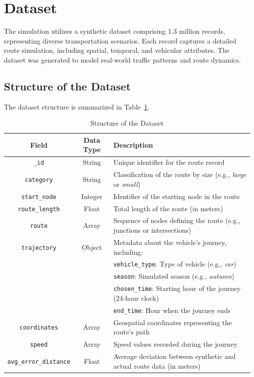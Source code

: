 \documentclass[sigplan,screen]{acmart}
\begin{document}
\section{Dataset}

The simulation utilizes a synthetic dataset comprising 1.3 million records, representing diverse transportation scenarios. Each record captures a detailed route simulation, including spatial, temporal, and vehicular attributes. The dataset was generated to model real-world traffic patterns and route dynamics.

\subsection{Structure of the Dataset}

The dataset structure is summarized in Table~\ref{tab:dataset-structure}.

\begin{table}[h!]
\centering
\caption{Structure of the Dataset}
\label{tab:dataset-structure}
\begin{tabular}{|c|c|l|}
\hline
\textbf{Field} & \textbf{Data Type} & \textbf{Description} \\ \hline
\texttt{\_id} & String & Unique identifier for the route record \\ \hline
\texttt{category} & String & Classification of the route by size (e.g., \textit{large} or \textit{small}) \\ \hline
\texttt{start\_node} & Integer & Identifier of the starting node in the route \\ \hline
\texttt{route\_length} & Float & Total length of the route (in meters) \\ \hline
\texttt{route} & Array & Sequence of nodes defining the route (e.g., junctions or intersections) \\ \hline
\texttt{trajectory} & Object & Metadata about the vehicle's journey, including: \\
& & \hspace{1em} \texttt{vehicle\_type}: Type of vehicle (e.g., \textit{car}) \\
& & \hspace{1em} \texttt{season}: Simulated season (e.g., \textit{autumn}) \\
& & \hspace{1em} \texttt{chosen\_time}: Starting hour of the journey (24-hour clock) \\
& & \hspace{1em} \texttt{end\_time}: Hour when the journey ends \\ \hline
\texttt{coordinates} & Array & Geospatial coordinates representing the route's path \\ \hline
\texttt{speed} & Array & Speed values recorded during the journey \\ \hline
\texttt{avg\_error\_distance} & Float & Average deviation between synthetic and actual route data (in meters) \\ \hline
\end{tabular}
\end{table}
\end{document}
